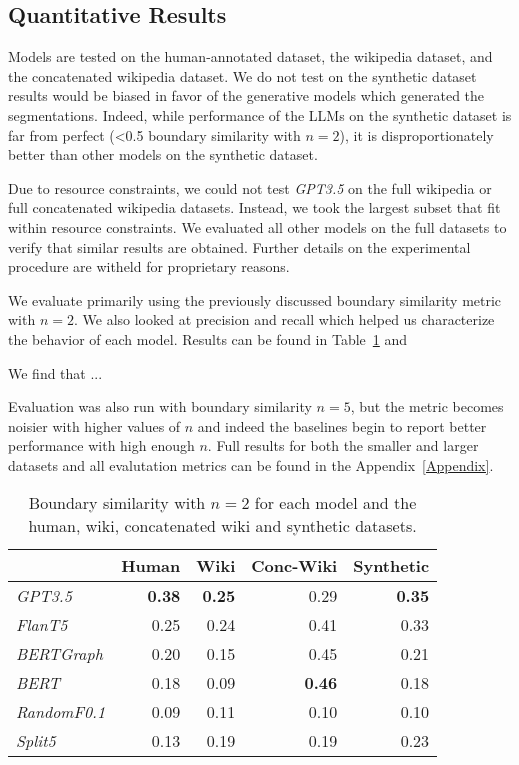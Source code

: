 
\subsection{Quantitative Results}

Models are tested on the human-annotated dataset, the wikipedia dataset, and the concatenated wikipedia dataset. We do not test on the synthetic dataset results would be biased in favor of the generative models which generated the segmentations. Indeed, while performance of the LLMs on the synthetic dataset is far from perfect (<0.5 boundary similarity with $n=2$), it is disproportionately better than other models on the synthetic dataset.

Due to resource constraints, we could not test \emph{GPT3.5} on the full wikipedia or full concatenated wikipedia datasets. Instead, we took the largest subset that fit within resource constraints. We evaluated all other models on the full datasets to verify that similar results are obtained. Further details on the experimental procedure are witheld for proprietary reasons.

We evaluate primarily using the previously discussed boundary similarity metric with $n=2$. We also looked at precision and recall which helped us characterize the behavior of each model. Results can be found in Table~\ref{tab:quant_results} and 

We find that ...
 
Evaluation was also run with boundary similarity $n=5$, but the metric becomes noisier with higher values of $n$ and indeed the baselines begin to report better performance with high enough $n$. Full results for both the smaller and larger datasets and all evalutation metrics can be found in the Appendix~\ref{Appendix}.

\begin{table}[ht]
\centering
\begin{tabular}{@{}lrrrr@{}}
\toprule
& Human & Wiki & Conc-Wiki & Synthetic \\ \midrule
\it GPT3.5  & \bf 0.38 & \bf 0.25 & 0.29 & \bf 0.35 \\ 
\it FlanT5  & 0.25 & 0.24 & 0.41 & 0.33 \\ 
\it BERTGraph & 0.20 & 0.15 & 0.45 & 0.21 \\ 
\it BERT & 0.18 & 0.09 & \bf 0.46 & 0.18 \\
\it RandomF0.1& 0.09 & 0.11 & 0.10 & 0.10 \\
\it Split5 & 0.13 & 0.19 & 0.19 & 0.23 \\
\bottomrule
\end{tabular}
\caption{Boundary similarity with $n=2$ for each model and the human, wiki, concatenated wiki and synthetic datasets.}
\label{tab:quant_results}
\end{table}

